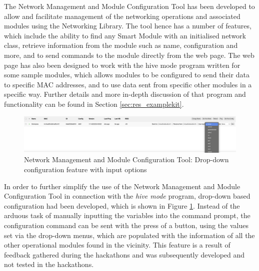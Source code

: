 The Network Management and Module Configuration Tool has been developed to allow and facilitate management of the networking operations and associated modules using the Networking Library. The tool hence has a number of features, which include the ability to find any Smart Module with an initialised network class, retrieve information from the module such as name, configuration and more, and to send commands to the module directly from the web page. The web page has also been designed to work with the hive mode program written for some sample modules, which allows modules to be configured to send their data to specific MAC addresses, and to use data sent from specific other modules in a specific way. Further details and more in-depth discussion of that program and functionality can be found in Section \ref{sec:res_examplekit}.

\begin{figure}[H]
    \centering
    \includegraphics[width=\linewidth]{overleaf/images/nmmct_drop2.png}
    \vspace{\ftspace}
    \caption{Network Management and Module Configuration Tool: Drop-down configuration feature with input options}
    \vspace{\ftspace}
    \label{fig:nmmct_drop}
\end{figure}

In order to further simplify the use of the Network Management and Module Configuration Tool in connection with the \textit{hive mode} program, drop-down based configuration had been developed, which is shown in Figure \ref{fig:nmmct_drop}. Instead of the arduous task of manually inputting the variables into the command prompt, the configuration command can be sent with the press of a button, using the values set via the drop-down menus, which are populated with the information of all the other operational modules found in the vicinity. This feature is a result of feedback gathered during the hackathons and was subsequently developed and not tested in the hackathons. 

